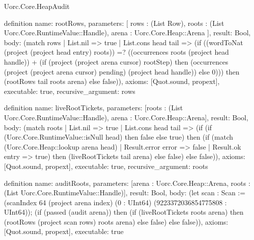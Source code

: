 \begin{lexlean}{Uorc.Core.HeapAudit}
\begin{semanticmodule}
definition{
  name: rootRows,
  parameters: [
    rows : (List Row),
    roots : (List Uorc.Core.RuntimeValue::Handle),
    arena : Uorc.Core.Heap::Arena
  ],
  result: Bool,
  body: (match rows
    | List.nil => true
    | List.cons head tail => (if ((wordToNat (project (project head entry) roots)) =? ((occurrences roots (project head handle)) + (if (project (project arena cursor) rootStep) then (occurrences (project (project arena cursor) pending) (project head handle)) else 0))) then (rootRows tail roots arena) else false)),
  axioms: [Quot.sound, propext],
  executable: true,
  recursive_argument: rows
}

definition{
  name: liveRootTickets,
  parameters: [roots : (List Uorc.Core.RuntimeValue::Handle), arena : Uorc.Core.Heap::Arena],
  result: Bool,
  body: (match roots
    | List.nil => true
    | List.cons head tail => (if (if (Uorc.Core.RuntimeValue::isNull head) then false else true) then (if (match (Uorc.Core.Heap::lookup arena head)
      | Result.error error => false
      | Result.ok entry => true) then (liveRootTickets tail arena) else false) else false)),
  axioms: [Quot.sound, propext],
  executable: true,
  recursive_argument: roots
}

definition{
  name: auditRoots,
  parameters: [arena : Uorc.Core.Heap::Arena, roots : (List Uorc.Core.RuntimeValue::Handle)],
  result: Bool,
  body: (let scan : Scan := (scanIndex 64 (project arena index) (0 : UInt64) (9223372036854775808 : UInt64)); (if (passed (audit arena)) then (if (liveRootTickets roots arena) then (rootRows (project scan rows) roots arena) else false) else false)),
  axioms: [Quot.sound, propext],
  executable: true
}
\end{semanticmodule}
\end{lexlean}
